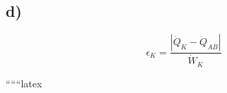 

\subsection*{d)}

\[
\epsilon_K = \frac{\left| \dot{Q}_K - \dot{Q}_{AB} \right|}{\dot{W}_K}
\]

``````latex